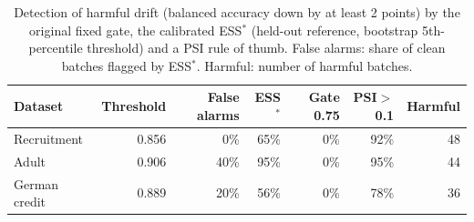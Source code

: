 \begin{table}[t]
\centering
\caption{Detection of harmful drift (balanced accuracy down by at least 2 points) by the original fixed gate, the calibrated ESS$^{\ast}$ (held-out reference, bootstrap 5th-percentile threshold) and a PSI rule of thumb. False alarms: share of clean batches flagged by ESS$^{\ast}$. Harmful: number of harmful batches.}
\label{tab:calibrated}
\small
\setlength{\tabcolsep}{4pt}
\begin{tabular}{lrrrrrr}
\toprule
Dataset & Threshold & False alarms & ESS$^{\ast}$ & Gate 0.75 & PSI$>$0.1 & Harmful \\
\midrule
Recruitment & 0.856 & 0\% & 65\% & 0\% & 92\% & 48 \\
Adult & 0.906 & 40\% & 95\% & 0\% & 95\% & 44 \\
German credit & 0.889 & 20\% & 56\% & 0\% & 78\% & 36 \\
\bottomrule
\end{tabular}
\end{table}
